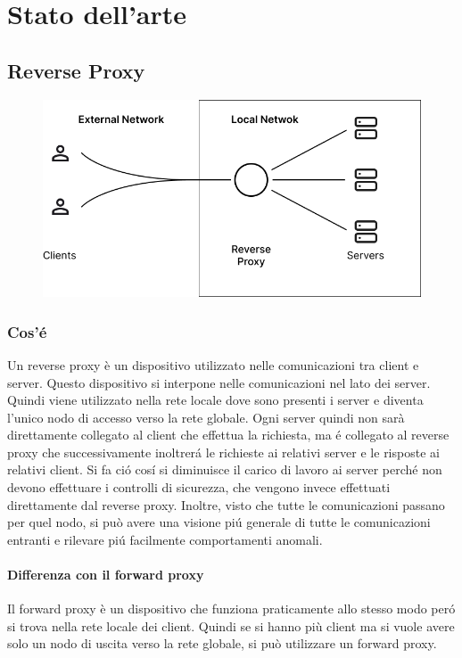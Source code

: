 \chapter{Stato dell'arte}
\label{cha:statoArte}

\section{Reverse Proxy}
\begin{figure}[h!]
  \centering
  \includegraphics[width=.6\textwidth]{images/schema.png}
\end{figure}

\subsection{Cos'é}
Un reverse proxy è un dispositivo utilizzato nelle comunicazioni tra client e server. Questo dispositivo si interpone nelle comunicazioni nel lato dei server. Quindi viene utilizzato nella rete locale dove sono presenti i server e diventa l'unico nodo di accesso verso la rete globale. Ogni server quindi non sarà direttamente collegato al client che effettua la richiesta, ma é collegato al reverse proxy che successivamente inoltrerá le richieste ai relativi server e le risposte ai relativi client. Si fa ció cosí si diminuisce il carico di lavoro ai server perché non devono effettuare i controlli di sicurezza, che vengono invece effettuati direttamente dal reverse proxy. Inoltre, visto che tutte le comunicazioni passano per quel nodo, si può avere una visione piú generale di tutte le comunicazioni entranti e rilevare piú facilmente comportamenti anomali.
\subsubsection{Differenza con il forward proxy}
Il forward proxy è un dispositivo che funziona praticamente allo stesso modo peró si trova nella rete locale dei client. Quindi se si hanno più client ma si vuole avere solo un nodo di uscita verso la rete globale, si può utilizzare un forward proxy.

